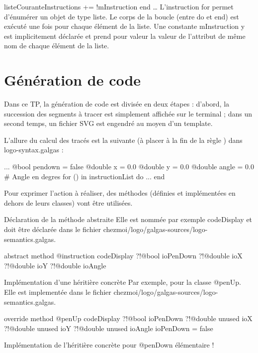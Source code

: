 listeCouranteInstructions += !mInstruction
end
…
L'instruction for permet d’énumérer un objet de type liste. Le corps de la boucle (entre do et end) est exécuté une fois pour chaque élément de la liste. Une constante mInstruction y est implicitement déclarée et prend pour valeur la valeur de l’attribut de même nom de chaque élément de la liste.

\section{Génération de code}

Dans ce TP, la génération de code est divisée en deux étapes : d'abord, la succession des segments à tracer est simplement affichée sur le terminal ; dans un second temps, un fichier SVG est engendré au moyen d'un template.

L'allure du calcul des tracés est la suivante (à placer à la fin de la règle ) dans logo-syntax.galgas :

\begin{galgascode}
  ...
  @bool pendown = false
  @double x = 0.0
  @double y = 0.0
  @double angle = 0.0 # Angle en degres
  for () in instructionList do
    ...
  end
\end{galgascode}

Pour exprimer l'action à réaliser, des méthodes (définies et implémentées en dehors de leurs classes) vont être utilisées.

Déclaration de la méthode abstraite
Elle est nommée par exemple codeDisplay et doit être déclarée dans le fichier chezmoi/logo/galgas-sources/logo-semantics.galgas.

\begin{galgascode}
abstract method @instruction codeDisplay
  ?!@bool ioPenDown
  ?!@double ioX
  ?!@double ioY
  ?!@double ioAngle
\end{galgascode}

Implémentation d'une héritière concrète
Par exemple, pour la classe @penUp. Elle est implementée dans le fichier chezmoi/logo/galgas-sources/logo-semantics.galgas.

\begin{galgascode}
override method @penUp codeDisplay
  ?!@bool ioPenDown
  ?!@double unused ioX
  ?!@double unused ioY
  ?!@double unused ioAngle
{
  ioPenDown = false
}
\end{galgascode}

Implémentation de l'héritière concrète pour @penDown
élémentaire !


